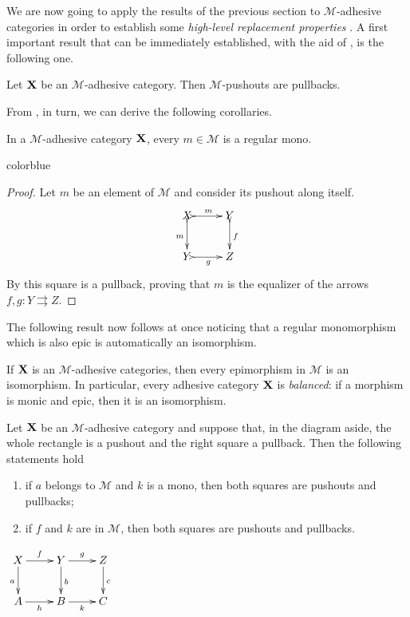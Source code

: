 \documentclass[a4paper,UKenglish,cleveref,pdftex,thm-restate,numberwithinsect]{lipics-v2021}
\newcommand{\full}[1]{{color{blue}#1}}
\newcommand{\full}[1]{}
\def\X{\textbf {\textup{X}}}
\def\Y{\textbf {\textup{Y}}}
\begin{document}
We are now going to apply the results of the previous section to $\mathcal{M}$-adhesive categories in order to establish some \emph{high-level replacement properties} \cite{ehrig2004adhesive,ehrig2014adhesive,ehrig2006fundamentals}.  
A first important  result that can be immediately established, with the aid of , is the following one.

\begin{proposition}
	\label{prop:pbpoad}
	Let $\X$ be an $\mathcal{M}$-adhesive category. Then
	$\mathcal{M}$-pushouts are pullbacks.
\end{proposition}

From , in turn, we can derive the following corollaries.
\begin{corollary}\label{cor:rego}
	In a $\mathcal{M}$-adhesive category $\X$, every $m\in\mathcal{M}$ is a regular mono.
\end{corollary}
\full{ 
\begin{proof}
	Let $m$ be an element of $\mathcal{M}$ and consider its pushout along itself.
	\[\xymatrix{X\ar@{>->}[r]^m \ar@{>->}[d]_m& Y\ar@{>->}[d]^{f}\\Y \ar@{>->}[r]_g & Z}\]
	By \Cref{prop:pbpoad} this square is a pullback, proving that $m$ is the equalizer of the arrows $f,g\colon Y\rightrightarrows Z$.
\end{proof}}

The following result now follows at once noticing that a regular monomorphism which is also epic is automatically an isomorphism.

\begin{corollary}\label{prop:bal}
	If $\X$ is an $\mathcal{M}$-adhesive categories, then every epimorphism in $\mathcal{M}$ is an isomorphism. In particular, every adhesive category $\X$ is \emph{balanced}: if a morphism is monic and epic, then it is an isomorphism.
\end{corollary}

\noindent 
\parbox{10cm}{\begin{lemma}\label{lem:popb} Let $\X$ be an $\mathcal{M}$-adhesive category  and suppose that, in the diagram aside, the whole rectangle is a pushout and the right square a pullback. Then the following statements hold
\parbox{13cm}	{\begin{enumerate}
		\item if $a$ belongs to $\mathcal{M}$ and $k$ is a mono,  then both squares are pushouts and pullbacks;
		\item if $f$ and $k $ are in  $\mathcal{M}$, then both squares are pushouts and pullbacks.
	\end{enumerate}}
\end{lemma}}
\parbox{4cm}{\vspace{-1cm}
	$\xymatrix{X \ar[d]_{a} \ar[r]^{f}& \ar[r]^{g} Y \ar[d]^{b}& Z \ar[d]^{c}\\ A \ar[r]_{h}& B \ar[r]_{k}& C}$}\\
\end{document}

